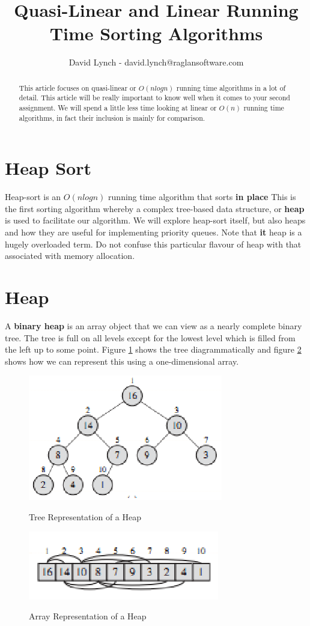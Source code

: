 \documentclass[10pt,a4paper]{article}
\title{Quasi-Linear and Linear Running Time Sorting Algorithms}
\author{David Lynch - david.lynch@raglansoftware.com }
\begin{document}
\maketitle
\begin{abstract}
This article focuses on quasi-linear or $O(n log n)$ running time algorithms in a lot of detail. This article will be really important to know well when it comes to your second assignment. We will spend a little less time looking at linear or $O(n)$ running time algorithms, in fact their inclusion is mainly for comparison. 
\end{abstract}
\section{Heap Sort}
Heap-sort is an $O(n log n)$ running time algorithm that sorts {\bf in place} This is the first sorting algorithm whereby a complex tree-based data structure, or {\bf heap} is used to facilitate our algorithm. We will explore heap-sort itself, but also heaps and how they are useful for implementing priority queues. Note that {\bf it} heap is a hugely overloaded term. Do not confuse this particular flavour of heap with that associated with memory allocation.   
\section{Heap}
A {\bf binary heap} is an array object that we can view as a nearly complete binary tree. The tree is full on all levels except for the lowest level which is filled from the left up to some point. Figure \ref{heap} shows the tree diagrammatically and figure \ref{heaparray} shows how we can represent this using a one-dimensional array. 
\begin{figure}
\caption{Tree Representation of a Heap \cite{INTROALG}}
\begin{center}
\includegraphics[scale=0.43]{../images/heap.png}
\label{heap}
\end{center}
\end{figure}
\begin{figure}
\caption{Array Representation of a Heap \cite{INTROALG}}
\begin{center}
\includegraphics[scale=0.43]{../images/heaparray.png}
\label{heaparray}
\end{center}
\end{figure}
\end{document}
